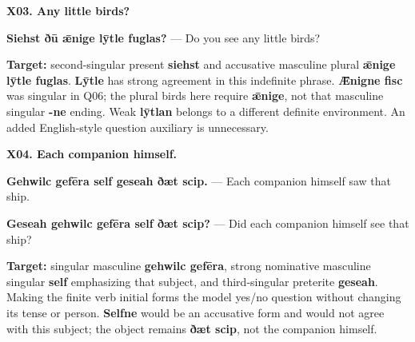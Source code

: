 \par\begin{minipage}{\linewidth}\raggedright
\textbf{X03. Any little birds?}

\textbf{Siehst ðū ǣnige lȳtle fuglas?} — Do you see any little birds?

\textbf{Target:} second-singular present \textbf{siehst} and accusative masculine plural \textbf{ǣnige lȳtle fuglas}. \textbf{Lȳtle} has strong agreement in this indefinite phrase. \textbf{Ǣnigne fisc} was singular in Q06; the plural birds here require \textbf{ǣnige}, not that masculine singular \textbf{-ne} ending. Weak \textbf{lȳtlan} belongs to a different definite environment. An added English-style question auxiliary is unnecessary.

\end{minipage}\par\addvspace{4pt}

\par\begin{minipage}{\linewidth}\raggedright
\textbf{X04. Each companion himself.}

\textbf{Gehwilc gefēra self geseah ðæt scip.} — Each companion himself saw that ship.

\textbf{Geseah gehwilc gefēra self ðæt scip?} — Did each companion himself see that ship?

\textbf{Target:} singular masculine \textbf{gehwilc gefēra}, strong nominative masculine singular \textbf{self} emphasizing that subject, and third-singular preterite \textbf{geseah}. Making the finite verb initial forms the model yes/\allowbreak{}no question without changing its tense or person. \textbf{Selfne} would be an accusative form and would not agree with this subject; the object remains \textbf{ðæt scip}, not the companion himself.

\end{minipage}\par\addvspace{4pt}

